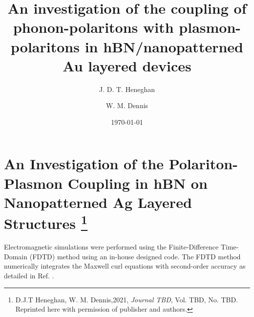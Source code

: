 \documentclass[
reprint,
amsmath,amssymb,
aip,
jap,
floatfix,
]{revtex4-2}
\begin{document}
 


\title{An investigation of the coupling of phonon-polaritons with plasmon-polaritons in hBN/nanopatterned Au layered devices}

\author{J. D. T. Heneghan}
\author{W. M. Dennis}

\date{\today}

\chapter[An Investigation of the Polariton-Plasmon Coupling in hBN on Nanopatterned Ag Layered Structures]
  {An Investigation of the Polariton-Plasmon Coupling in hBN on Nanopatterned Ag Layered Structures%
  \footnote{D.J.T Heneghan, W. M. Dennis,2021, 
  \emph{Journal TBD}, Vol. TBD, No. TBD. \indent\indent Reprinted here with permission of publisher and authors.}}
  \label{chapter:Ag_hBN}

  \newpage


	Electromagnetic simulations were performed using the Finite-Difference Time-Domain (FDTD) method    using an in-house designed code. The FDTD method numerically integrates the Maxwell curl equations with second-order accuracy as detailed in Ref. \cite{Wan:16}.
\end{document}
